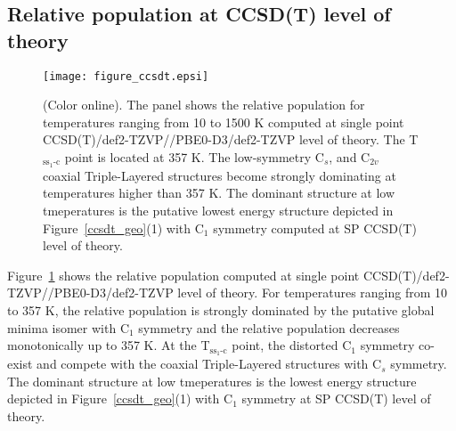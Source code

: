 \documentclass[prb,aps,preprint,showkeys,showpacs]{revtex4}
\begin{document}
\subsection{Relative population at CCSD(T) level of theory}
 \begin{figure}[ht!]
  \begin{center}  
    \texttt{[image: figure\_ccsdt.epsi]}
    \caption{(Color online). The panel shows the relative population for temperatures ranging from 10 to 1500 K computed at single point CCSD(T)/def2-TZVP//PBE0-D3/def2-TZVP level of theory. The {\large{T$_{\textrm{ss$_1$-c}}$}} point is located at 357 K. The low-symmetry  C$_s$, and  C$_{2v}$ coaxial Triple-Layered structures become strongly dominating at temperatures higher than 357 K. The dominant structure at low tmeperatures  is the putative lowest energy structure depicted in Figure~\ref{ccsdt_geo}(1) with C$_1$ symmetry computed at SP CCSD(T) level of theory.}
    \label{popucc}
  \end{center}
  \end{figure}
 Figure~\ref{popucc} shows the relative population computed at single point  CCSD(T)/def2-TZVP//PBE0-D3/def2-TZVP level of theory.  For temperatures ranging from 10 to 357 K, the relative population is strongly dominated by the putative global minima isomer with C$_1$ symmetry and the relative population  decreases monotonically up to 357 K.  At the {\large{T$_{\textrm{ss$_1$-c}}$}} point, the distorted  C$_1$ symmetry co-exist and compete with the coaxial Triple-Layered structures with C$_s$ symmetry. The dominant structure at low tmeperatures  is the lowest energy structure depicted in Figure~\ref{ccsdt_geo}(1) with C$_1$ symmetry at SP CCSD(T) level of theory.
\end{document}
